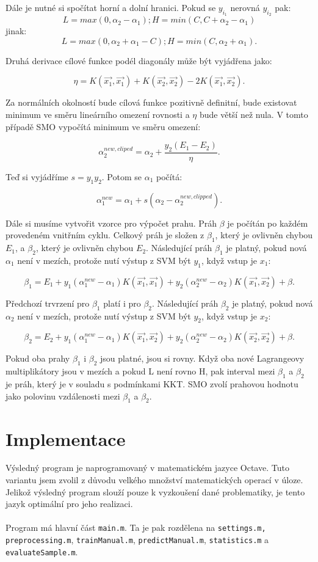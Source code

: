\documentclass[a4]{article}
\begin{document}
\noindent Dále je nutné si spočítat horní a dolní hranici. Pokud se $y_{i_1}$ nerovná $y_{i_2}$ pak:
$$
L=max(0,\alpha_2 - \alpha_1) ; H=min(C, C+\alpha_2 - \alpha_1)
$$
jinak:
$$
L=max(0,\alpha_2 + \alpha_1 - C) ; H=min(C, \alpha_2 + \alpha_1).
$$

\noindent Druhá derivace cílové funkce podél diagonály může být vyjádřena jako:

$$
\eta=K(\vec{x_1},\vec{x_1}) + K(\vec{x_2},\vec{x_2}) -2K(\vec{x_1},\vec{x_2}).
$$

\noindent Za normálních okolností bude cílová funkce pozitivně definitní, bude existovat
minimum ve směru lineárního omezení rovnosti a $\eta$ bude větší než nula. V
tomto případě SMO vypočítá minimum ve směru omezení:

$$
\alpha_{2}^{new,cliped} = \alpha_{2}+\frac{y_{2}(E_{1}-E_{2})}{\eta}.
$$

\noindent Teď si vyjádříme $s=y_{1}y_{2}$. Potom se $\alpha_1$ počítá:

$$
\alpha_{1}^{new}=\alpha_{1}+s(\alpha_{2}-\alpha_{2}^{new,clipped}).
$$

\noindent Dále si musíme vytvořit vzorce pro výpočet prahu. Práh $\beta$ je počítán po každém provedeném vnitřním cyklu. Celkový práh je složen z $\beta_1$, který  je ovlivněn chybou $E_1$, a $\beta_2$, který je ovlivněn chybou $E_2$. Následující práh $\beta_1$ je platný, pokud nová $\alpha_{1}$ není v mezích, protože nutí výstup z SVM být $y_1$, když vstup je $x_1$:

$$
\beta_1=E_1+y_1(\alpha_1^{new}-\alpha_{1})K(\vec{x_1},\vec{x_1})+y_2(\alpha_2^{new}-\alpha_2)K(\vec{x_1},\vec{x_2})+\beta.
$$

\noindent Předchozí trvrzení pro $\beta_1$ platí i pro $\beta_2$. Následující práh $\beta_2$ je platný, pokud nová $\alpha_{2}$ není v mezích, protože nutí výstup z SVM být $y_2$, když vstup je $x_2$:

$$
\beta_2=E_2+y_1(\alpha_1^{new}-\alpha_{1})K(\vec{x_1},\vec{x_2})+y_2(\alpha_2^{new}-\alpha_2)K(\vec{x_2},\vec{x_2})+\beta.
$$

\noindent Pokud oba prahy $\beta_1$ i $\beta_2$ jsou platné, jsou si rovny. Když oba nové Lagrangeovy multiplikátory jsou v mezích a pokud L není rovno H, pak interval mezi $\beta_1$ a $\beta_2$ je práh, který je v souladu s podmínkami KKT. SMO zvolí prahovou hodnotu jako polovinu vzdálenosti mezi $\beta_1$ a $\beta_2$.\cite{smo_platt_original}

\section{Implementace}
Výsledný program je naprogramovaný v matematickém jazyce Octave. Tuto variantu jsem zvolil z důvodu velkého množství matematických operací v úloze. Jelikož výsledný program slouží pouze k vyzkoušení dané problematiky, je tento jazyk optimální pro jeho realizaci.
\\\\
Program má hlavní část \texttt{main.m}. Ta je pak rozdělena na \texttt{settings.m, preprocessing.m}, \texttt{trainManual.m}, \texttt{predictManual.m}, \texttt{statistics.m} a \texttt{evaluateSample.m}.
\end{document}
